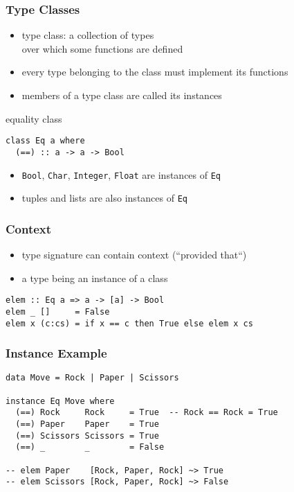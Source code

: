 \documentclass[dvipsnames]{beamer}
\theoremstyle{plain}
\begin{document}
\begin{frame}[fragile]
  \frametitle{Type Classes}

  \begin{itemize}
    \item \alert{type class}: a collection of types\\
      over which some functions are defined
    \item every type belonging to the class must implement its functions
    \item members of a type class are called its \alert{instances}
  \end{itemize}

  \pause
  \begin{exampleblock}{equality class}
    \begin{lstlisting}
class Eq a where
  (==) :: a -> a -> Bool
    \end{lstlisting}
    \begin{itemize}
      \item \lstinline|Bool|, \lstinline|Char|, \lstinline|Integer|, \lstinline|Float|
        are instances of \lstinline|Eq|
      \item tuples and lists are also instances of \lstinline|Eq|
    \end{itemize}
  \end{exampleblock}
\end{frame}

\begin{frame}[fragile]
  \frametitle{Context}

  \begin{itemize}
    \item type signature can contain context (``provided that``)
    \item a type being an instance of a class
  \end{itemize}

  \begin{exampleblock}{}
    \begin{lstlisting}[deletekeywords={elem}]
elem :: Eq a => a -> [a] -> Bool
elem _ []     = False
elem x (c:cs) = if x == c then True else elem x cs
    \end{lstlisting}
  \end{exampleblock}
\end{frame}

\begin{frame}[fragile]
  \frametitle{Instance Example}

  \begin{lstlisting}
data Move = Rock | Paper | Scissors

instance Eq Move where
  (==) Rock     Rock     = True  -- Rock == Rock = True
  (==) Paper    Paper    = True
  (==) Scissors Scissors = True
  (==) _        _        = False

-- elem Paper    [Rock, Paper, Rock] ~> True
-- elem Scissors [Rock, Paper, Rock] ~> False
  \end{lstlisting}
\end{frame}
\end{document}
